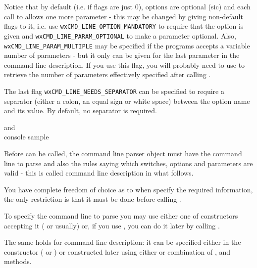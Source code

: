 Notice that by default (i.e. if flags are just $0$), options are optional (sic)
and each call to  allows one more
parameter - this may be changed by giving non-default flags to it, i.e. use 
{\tt wxCMD\_LINE\_OPTION\_MANDATORY} to require that the option is given and 
{\tt wxCMD\_LINE\_PARAM\_OPTIONAL} to make a parameter optional. Also, 
{\tt wxCMD\_LINE\_PARAM\_MULTIPLE} may be specified if the programs accepts a
variable number of parameters - but it only can be given for the last parameter
in the command line description. If you use this flag, you will probably need to
use  to retrieve the number
of parameters effectively specified after calling 
.

The last flag {\tt wxCMD\_LINE\_NEEDS\_SEPARATOR} can be specified to require a
separator (either a colon, an equal sign or white space) between the option
name and its value. By default, no separator is required.


 and \\
console sample


\label{wxcmdlineparserconstruction}

Before  can be called, the command line
parser object must have the command line to parse and also the rules saying
which switches, options and parameters are valid - this is called command line
description in what follows.

You have complete freedom of choice as to when specify the required information,
the only restriction is that it must be done before calling 
.

To specify the command line to parse you may use either one of constructors
accepting it ( or 
 usually) or,
if you use ,
you can do it later by calling 
.

The same holds for command line description: it can be specified either in
the constructor ( or 
) or
constructed later using either  or
combination of , 
 and 
 methods.

